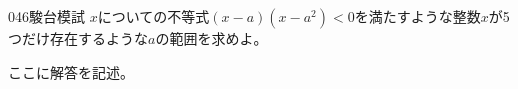 \begin{prob}{046}{\maru}{駿台模試}
 $x$についての不等式$(x-a)(x-a^2)<0$を満たすような整数$x$が5つだけ存在するような$a$の範囲を求めよ。
\end{prob}
ここに解答を記述。